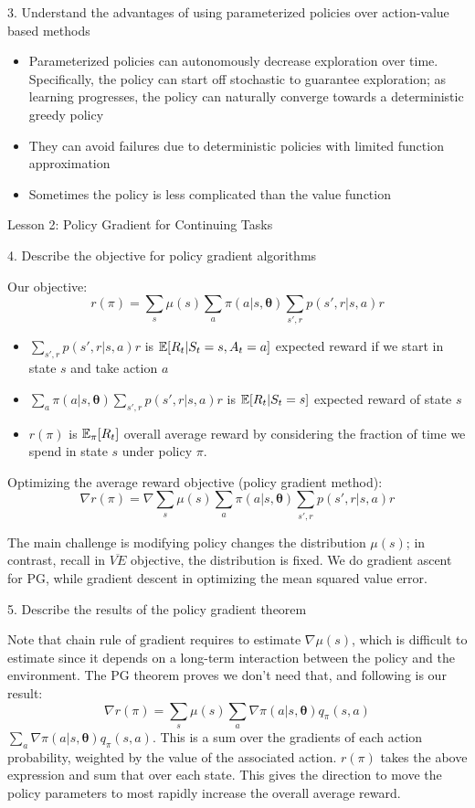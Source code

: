 \documentclass[sutton_barto_notes.tex]{subfiles}
\begin{document}
3. Understand the advantages of using parameterized policies over action-value based methods 

\begin{itemize}
\item Parameterized policies can autonomously decrease exploration over time. Specifically, the policy can start off stochastic to guarantee exploration; as learning progresses, the policy can naturally converge towards a deterministic greedy policy
\item They can avoid failures due to deterministic policies with limited function approximation
\item Sometimes the policy is less complicated than the value function
\end{itemize}

Lesson 2: Policy Gradient for Continuing Tasks 

4. Describe the objective for policy gradient algorithms 

Our objective:
$$r(\pi) = \sum_s \mu(s) \sum_a \pi(a|s,\bm{\theta}) \sum_{s',r} p(s',r|s,a)r $$
\begin{itemize}
\item $\sum_{s',r} p(s',r|s,a)r$ is $\operatorname*{\mathbb{E}}[R_t | S_t=s,A_t=a]$ expected reward if we start in state $s$ and take action $a$
\item $\sum_a \pi(a|s,\bm{\theta}) \sum_{s',r} p(s',r|s,a)r$ is $\operatorname*{\mathbb{E}}[R_t | S_t=s]$ expected reward of state $s$
\item $r(\pi)$ is $\operatorname*{\mathbb{E}}_\pi [ R_t ]$ overall average reward by considering the fraction of time we spend in state $s$ under policy $\pi$.
\end{itemize}
Optimizing the average reward objective (policy gradient method):
$$\nabla r(\pi) = \nabla \sum_s \mu(s) \sum_a \pi(a|s,\bm{\theta}) \sum_{s',r} p(s',r|s,a)r $$

The main challenge is modifying policy changes the distribution $\mu(s)$; in contrast, recall in $\overline{VE}$ objective, the distribution is fixed. We do gradient ascent for PG, while gradient descent in optimizing the mean squared value error.

5. Describe the results of the policy gradient theorem 

Note that chain rule of gradient requires to estimate $\nabla \mu(s)$, which is difficult to estimate since it depends on a long-term interaction between the policy and the environment. The PG theorem proves we don't need that, and following is our result:
$$\nabla r(\pi) = \sum_s \mu(s) \sum_a \nabla \pi(a|s,\bm{\theta}) q_\pi(s,a)$$
$\sum_a \nabla \pi(a|s,\bm{\theta}) q_\pi(s,a)$. This is a sum over the gradients of each action probability, weighted by the value of the associated action.
$r(\pi)$ takes the above expression and sum that over each state. This gives the direction to move the policy parameters to most rapidly increase the overall average reward.
\end{document}
